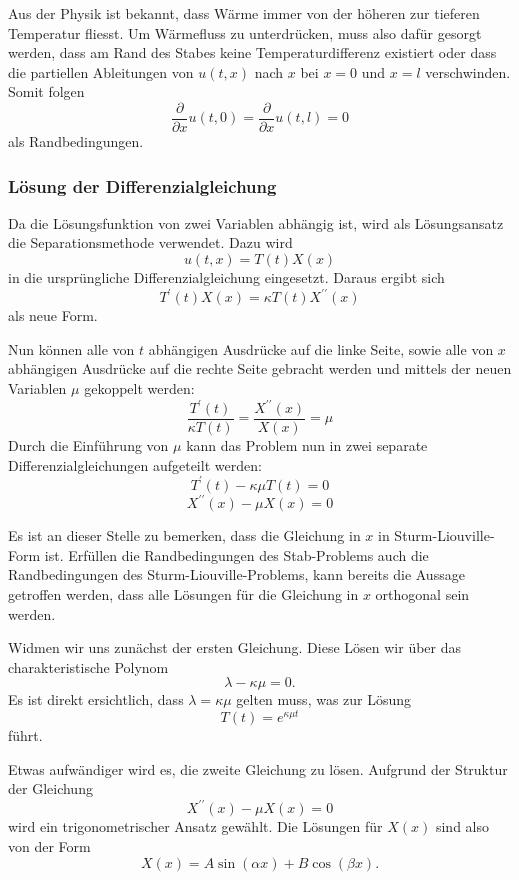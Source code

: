 Aus der Physik ist bekannt, dass Wärme immer von der höheren zur tieferen
Temperatur fliesst. Um Wärmefluss zu unterdrücken, muss also dafür gesorgt
werden, dass am Rand des Stabes keine Temperaturdifferenz existiert oder 
dass die partiellen Ableitungen von $u(t,x)$ nach $x$ bei $x = 0$ und $x = l$
verschwinden. Somit folgen
\[
    \frac{\partial}{\partial x} u(t, 0)
    =
    \frac{\partial}{\partial x} u(t, l)
    =
    0
\]
als Randbedingungen.


\subsubsection{Lösung der Differenzialgleichung}


Da die Lösungsfunktion von zwei Variablen abhängig ist, wird als Lösungsansatz
die Separationsmethode verwendet. Dazu wird 
\[
    u(t,x)
    =
    T(t)X(x)
\]
in die ursprüngliche Differenzialgleichung eingesetzt. Daraus ergibt sich 
\[
    T^{\prime}(t)X(x)
    =
    \kappa T(t)X^{\prime \prime}(x)
\]
als neue Form.

Nun können alle von $t$ abhängigen Ausdrücke auf die linke Seite, sowie alle
von $x$ abhängigen Ausdrücke auf die rechte Seite gebracht werden und mittels
der neuen Variablen $\mu$ gekoppelt werden:
\[
    \frac{T^{\prime}(t)}{\kappa T(t)}
    =
    \frac{X^{\prime \prime}(x)}{X(x)}
    =
    \mu
\]
Durch die Einführung von $\mu$ kann das Problem nun in zwei separate
Differenzialgleichungen aufgeteilt werden:
\[
    T^{\prime}(t) - \kappa \mu T(t)
    =
    0
\]
\[
    X^{\prime \prime}(x) - \mu X(x)
    =
    0
\]

Es ist an dieser Stelle zu bemerken, dass die Gleichung in $x$ in 
Sturm-Liouville-Form ist. Erfüllen die Randbedingungen des Stab-Problems auch
die Randbedingungen des Sturm-Liouville-Problems, kann bereits die Aussage
getroffen werden, dass alle Lösungen für die Gleichung in $x$ orthogonal sein
werden.

Widmen wir uns zunächst der ersten Gleichung. Diese Lösen wir über das
charakteristische Polynom
\[
    \lambda - \kappa \mu
    =
    0.
\]
Es ist direkt ersichtlich, dass $\lambda = \kappa \mu$ gelten muss, was zur
Lösung
\[
    T(t)
    =
    e^{\kappa \mu t}
\]
führt.

Etwas aufwändiger wird es, die zweite Gleichung zu lösen. Aufgrund der Struktur
der Gleichung
\[
    X^{\prime \prime}(x) - \mu X(x)
    =
    0
\]
wird ein trigonometrischer Ansatz gewählt. Die Lösungen für $X(x)$ sind also
von der Form
\[
    X(x)
    =
    A \sin \left( \alpha x\right) + B \cos \left( \beta x\right).
\]

